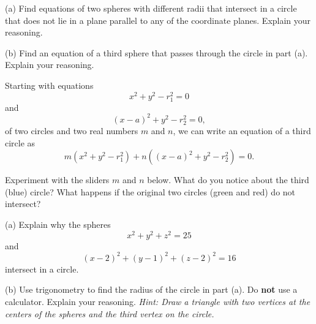 \documentclass{ximera}
\begin{document}
\begin{question} \label{Q53:Coordinates}
(a) Find equations of two spheres with different radii that intersect in a circle that does not lie in a plane parallel to any of the coordinate planes. Explain your reasoning.

(b) Find an equation of a third sphere that passes through the circle in part (a). Explain your reasoning. 

\begin{hint} 
Starting with equations 
\[
      x^2 + y^2 - r_1^2 = 0
\]
and 
\[
    (x-a)^2 +y^2 - r_2^2 = 0 ,
\]
of two circles and two real numbers $m$ and $n$, we can write an equation of a third circle as
\[
          m(x^2 + y^2 - r_1^2) + n((x-a)^2 +y^2 - r_2^2) = 0.
\]

Experiment with the sliders $m$ and $n$ below. What do you notice about the third (blue) circle? What happens if the original two circles (green and red) do not intersect?


 
\begin{onlineOnly}
    \begin{center}
\end{center}
\end{onlineOnly}
\end{hint}


\end{question}


\begin{question} \label{Q533:Coordinates}
(a) Explain why the spheres
\[
     x^2 + y^2 + z^2 = 25
\]
and
\[
    (x-2)^2 + (y-1)^2 + (z-2)^2 = 16
\]
intersect in a circle.

(b) Use trigonometry to find the radius of the circle  in part (a). Do {\bf not} use a calculator. Explain your reasoning. \it{Hint:} Draw a triangle with two vertices at the centers of the spheres and the third vertex on the circle.

\end{question}
\end{document}
